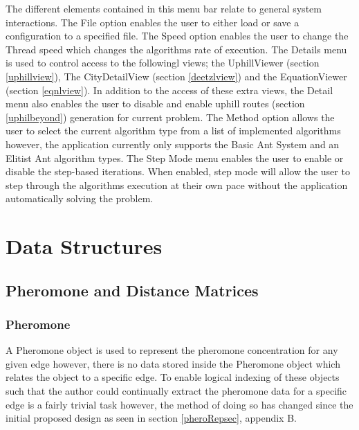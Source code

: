 The different elements contained in this menu bar relate to general system interactions. The File option enables the user to either load or save a configuration to a specified file. The Speed option enables the user to change the Thread speed which changes the algorithms rate of execution. The Details menu is used to control access to the followingl views; the UphillViewer (section \ref{uphillview}), The CityDetailView (section \ref{deetzlview}) and the EquationViewer (section \ref{eqnlview}). In addition to the access of these extra views, the Detail menu also enables the user to disable and enable uphill routes (section \ref{uphilbeyond}) generation for current problem. The Method option allows the user to select the current algorithm type from a list of implemented algorithms however, the application currently only supports the Basic Ant System and an Elitist Ant algorithm types. The Step Mode menu enables the user to enable or disable the step-based iterations. When enabled, step mode will allow the user to step through the algorithms execution at their own pace without the application automatically solving the problem.

\section{Data Structures}

\subsection{Pheromone and Distance Matrices}

\subsubsection{Pheromone}
\label{phero:struct}
A Pheromone object is used to represent the pheromone concentration for any given edge however, there is no data stored inside the Pheromone object which relates the object to a specific edge. To enable logical indexing of these objects such that the author could continually extract the pheromone data for a specific edge is a fairly trivial task however, the method of doing so has changed since the initial proposed design as seen in section \ref{pheroRepsec}, appendix B.

